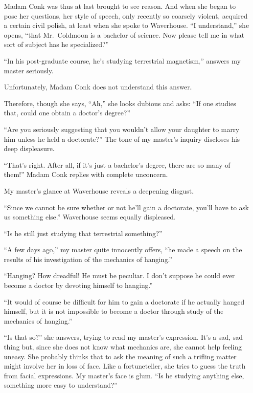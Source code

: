 \documentclass[12pt, openright]{book}
\begin{document}
Madam Conk was thus at last brought to see reason. And when she began to
pose her questions, her style of speech, only recently so coarsely
violent, acquired a certain civil polish, at least when she spoke to
Waverhouse. ``I understand,'' she opens, ``that Mr.~Coldmoon is a
bachelor of science. Now please tell me in what sort of subject has he
specialized?''

``In his post-graduate course, he's studying terrestrial magnetism,''
answers my master seriously.

Unfortunately, Madam Conk does not understand this answer.

Therefore, though she says, ``Ah,'' she looks dubious and asks: ``If one
studies that, could one obtain a doctor's degree?''

``Are you seriously suggesting that you wouldn't allow your daughter to
marry him unless he held a doctorate?'' The tone of my master's inquiry
discloses his deep displeasure.

``That's right. After all, if it's just a bachelor's degree, there are
so many of them!'' Madam Conk replies with complete unconcern.

My master's glance at Waverhouse reveals a deepening disgust.

``Since we cannot be sure whether or not he'll gain a doctorate, you'll
have to ask us something else.'' Waverhouse seems equally displeased.

``Is he still just studying that terrestrial something?''

``A few days ago,'' my master quite innocently offers, ``he made a
speech on the results of his investigation of the mechanics of
hanging.''

``Hanging? How dreadful! He must be peculiar. I don't suppose he could
ever become a doctor by devoting himself to hanging.''

``It would of course be difficult for him to gain a doctorate if he
actually hanged himself, but it is not impossible to become a doctor
through study of the mechanics of hanging.''

``Is that so?'' she answers, trying to read my master's expression. It's
a sad, sad thing but, since she does not know what mechanics are, she
cannot help feeling uneasy. She probably thinks that to ask the meaning
of such a trifling matter might involve her in loss of face. Like a
fortuneteller, she tries to guess the truth from facial expressions. My
master's face is glum. ``Is he studying anything else, something more
easy to understand?''
\end{document}
